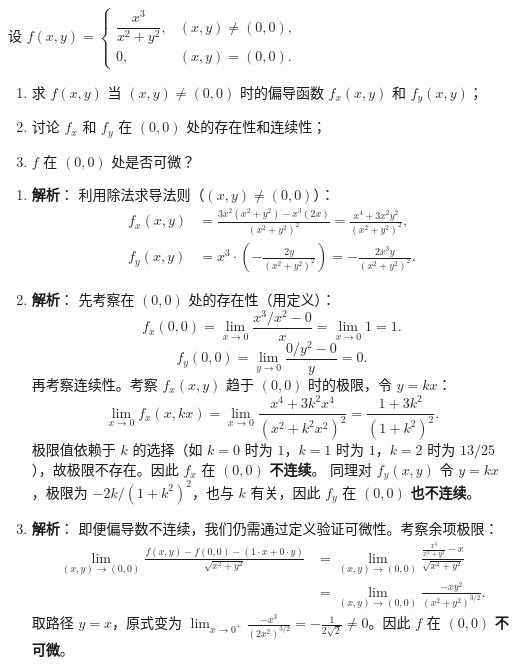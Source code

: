 \documentclass[lang=cn,11pt]{elegantbook}
\begin{document}
\begin{exercise}[偏导数连续性的分析]
设 $f(x,y)=\begin{cases} \dfrac{x^3}{x^2+y^2},&(x,y) \neq (0,0),\\[8pt] 0,&(x,y)=(0,0). \end{cases}$
\begin{enumerate}
  \item[(1)] 求 $f(x,y)$ 当 $(x,y) \neq (0,0)$ 时的偏导函数 $f_x(x,y)$ 和 $f_y(x,y)$；
  \item[(2)] 讨论 $f_x$ 和 $f_y$ 在 $(0,0)$ 处的存在性和连续性；
  \item[(3)] $f$ 在 $(0,0)$ 处是否可微？
\end{enumerate}
\end{exercise}
\begin{solution}
\begin{enumerate}
  \item[(1)] \textbf{解析}：
  利用除法求导法则（$(x,y) \neq (0,0)$）：
  \begin{align*}
  f_x(x,y) &= \frac{3x^2(x^2+y^2) - x^3(2x)}{(x^2+y^2)^2} = \frac{x^4 + 3x^2y^2}{(x^2+y^2)^2}, \\[6pt]
  f_y(x,y) &= x^3 \cdot \left(-\frac{2y}{(x^2+y^2)^2}\right) = -\frac{2x^3y}{(x^2+y^2)^2}.
  \end{align*}
  
  \item[(2)] \textbf{解析}：
  先考察在 $(0,0)$ 处的存在性（用定义）：
  \[
  f_x(0,0) = \lim_{x \to 0} \frac{x^3/x^2 - 0}{x} = \lim_{x \to 0} 1 = 1.
  \]
  \[
  f_y(0,0) = \lim_{y \to 0} \frac{0/y^2 - 0}{y} = 0.
  \]
  再考察连续性。考察 $f_x(x,y)$ 趋于 $(0,0)$ 时的极限，令 $y=kx$：
  \[
  \lim_{x \to 0} f_x(x,kx) = \lim_{x \to 0} \frac{x^4 + 3k^2x^4}{(x^2+k^2x^2)^2} = \frac{1+3k^2}{(1+k^2)^2}.
  \]
  极限值依赖于 $k$ 的选择（如 $k=0$ 时为 $1$，$k=1$ 时为 $1$，$k=2$ 时为 $13/25$），故极限不存在。因此 $f_x$ 在 $(0,0)$ \textbf{不连续}。
  同理对 $f_y(x,y)$ 令 $y=kx$，极限为 $-2k/(1+k^2)^2$，也与 $k$ 有关，因此 $f_y$ 在 $(0,0)$ \textbf{也不连续}。
  
  \item[(3)] \textbf{解析}：
  即便偏导数不连续，我们仍需通过定义验证可微性。考察余项极限：
  \begin{align*}
  \lim_{(x,y) \to (0,0)} \frac{f(x,y) - f(0,0) - (1 \cdot x + 0 \cdot y)}{\sqrt{x^2+y^2}} 
  &= \lim_{(x,y) \to (0,0)} \frac{\frac{x^3}{x^2+y^2} - x}{\sqrt{x^2+y^2}} \\
  &= \lim_{(x,y) \to (0,0)} \frac{-xy^2}{(x^2+y^2)^{3/2}}.
  \end{align*}
  取路径 $y=x$，原式变为 $\lim_{x \to 0^+} \frac{-x^3}{(2x^2)^{3/2}} = -\frac{1}{2\sqrt{2}} \neq 0$。因此 $f$ 在 $(0,0)$ \textbf{不可微}。
\end{enumerate}
\end{solution}
\end{document}
